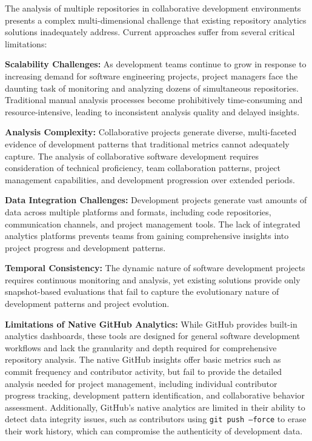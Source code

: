 \documentclass[12pt,a4paper]{article}
\begin{document}
The analysis of multiple repositories in collaborative development environments presents a complex multi-dimensional challenge that existing repository analytics solutions inadequately address. Current approaches suffer from several critical limitations:

\textbf{Scalability Challenges:} As development teams continue to grow in response to increasing demand for software engineering projects, project managers face the daunting task of monitoring and analyzing dozens of simultaneous repositories. Traditional manual analysis processes become prohibitively time-consuming and resource-intensive, leading to inconsistent analysis quality and delayed insights.

\textbf{Analysis Complexity:} Collaborative projects generate diverse, multi-faceted evidence of development patterns that traditional metrics cannot adequately capture. The analysis of collaborative software development requires consideration of technical proficiency, team collaboration patterns, project management capabilities, and development progression over extended periods.

\textbf{Data Integration Challenges:} Development projects generate vast amounts of data across multiple platforms and formats, including code repositories, communication channels, and project management tools. The lack of integrated analytics platforms prevents teams from gaining comprehensive insights into project progress and development patterns.

\textbf{Temporal Consistency:} The dynamic nature of software development projects requires continuous monitoring and analysis, yet existing solutions provide only snapshot-based evaluations that fail to capture the evolutionary nature of development patterns and project evolution.

\textbf{Limitations of Native GitHub Analytics:} While GitHub provides built-in analytics dashboards, these tools are designed for general software development workflows and lack the granularity and depth required for comprehensive repository analysis. The native GitHub insights offer basic metrics such as commit frequency and contributor activity, but fail to provide the detailed analysis needed for project management, including individual contributor progress tracking, development pattern identification, and collaborative behavior assessment. Additionally, GitHub's native analytics are limited in their ability to detect data integrity issues, such as contributors using \texttt{git push --force} to erase their work history, which can compromise the authenticity of development data.
\end{document}
